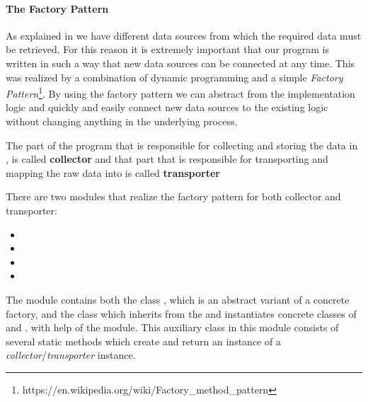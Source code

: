\paragraph{The Factory Pattern}
\label{par:factory}
As explained in  we have different data sources from which the required data must be retrieved.
For this reason it is extremely important that our program is written in such a way that new data sources can be connected at any time.
This was realized by a combination of dynamic programming and a simple \textit{Factory Pattern}\footnote{https://en.wikipedia.org/wiki/Factory_method_pattern}.
By using the factory pattern we can abstract from the implementation logic and quickly and easily connect new data sources to the existing logic without changing anything in the underlying process.

The part of the program that is responsible for collecting and storing the data in \gds{}, is called \textbf{collector}
and that part that is responsible for transporting and mapping the raw data into \pg{} is called \textbf{transporter}

There are two modules that realize the factory pattern for both collector and transporter:

\begin{itemize}
  \item {}
  \item {}
  \item {}
  \item {}
\end{itemize}

The module  contains both the class , which is an abstract variant of a concrete factory, and the class
 which inherits from the  and instantiates concrete classes of  and .
with help of the  module.
This auxiliary class in this module consists of several static methods which create and return an instance of a \textit{collector}/\textit{transporter} instance.
